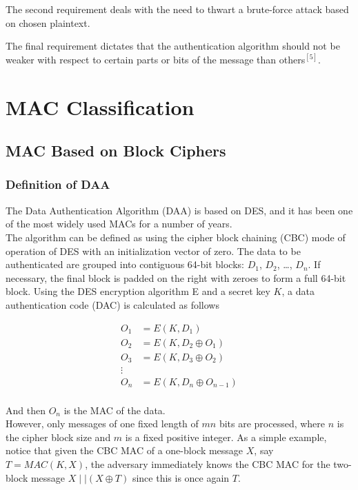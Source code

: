 \documentclass[12pt,a4paper,oneside]{report}
\begin{document}
The second requirement deals with the need to thwart a brute-force attack based on chosen plaintext.

The final requirement dictates that the authentication algorithm should not be weaker with respect to certain parts or bits of the message than others$^{[5]}$.

\chapter{  MAC Classification}
\section{MAC Based on Block Ciphers}
\subsection{Definition of DAA}

The Data Authentication Algorithm (DAA) is based on DES, and it has been one of the most widely used MACs for a number of years. \\

The algorithm can be defined as using the cipher block chaining (CBC) mode of operation of DES with an initialization vector of zero. The data  to be authenticated are grouped into contiguous 64-bit
blocks: $D_1$, $D_2$, \dots, $D_n$. If necessary, the final block is padded on the right with zeroes
to form a full 64-bit block. Using the DES encryption algorithm E and a secret key $K$,
a data authentication code (DAC) is calculated as follows

\begin{align*}
    O_1 &= E(K,D_1) \\
    O_2 &= E(K,D_2 \oplus O_1) \\
    O_3 &= E(K,D_3 \oplus O_2) \\
    \vdots \\
    O_n &= E(K,D_n \oplus O_{n-1}) \\
\end{align*}

And then $O_n$ is the MAC of the data.\\

However, only messages of one fixed length of $mn$ bits
are processed, where $n$ is the cipher block size and $m$ is a fixed positive integer. As a
simple example, notice that given the CBC MAC of a one-block message $X$, say
$T = MAC(K, X)$, the adversary immediately knows the CBC MAC for the two-
block message $X \mid\mid (X \oplus T)$ since this is once again $T$.
\end{document}
